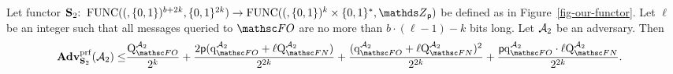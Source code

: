 \begin{lemma}\label{lm-ourF2} Let functor $\ourF_2\Colon \AllFuncs(\bits^{b+2k},\bits^{2k}) \to \AllFuncs(\bits^k\cross\bits^*,\Z_{\Prime})$ be defined as in Figure~\ref{fig-our-functor}. Let $\ell$ be an integer such that all messages queried to $\HASH$ are no more than $b \cdot (\ell-1) - k$ bits long. Let $\mathcal{A}_2$ be an adversary. Then
\begin{align*}
	\prfAdv{\ourF_2}{\advA_2}  \leq& \frac{\Queries{\HASH}{\advA_2}}{2^k}
	+ \frac{2\Prime (\QueriesD{\HASH}{\advA_2}+ \ell \Queries{\FUNCO}{\advA_2})}{2^{2k}}
	+ \frac{(\QueriesD{\HASH}{\advA_2} + \ell \Queries{\FUNCO}{\advA_2})^2}{2^{2k}}
	+ \frac{\Prime\QueriesD{\HASH}{\advA_2} \cdot \ell\Queries{\FUNCO}{\advA_2}}{2^{2k}} 
	.
	\label{eq-lm-ourF2}
\end{align*}
\end{lemma}
